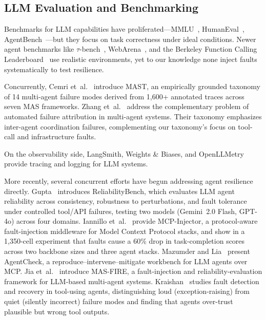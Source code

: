 \documentclass[make,article,submit,moreauthors,pdftex]{mdpi}
\begin{document}
\subsection{LLM Evaluation and Benchmarking}

Benchmarks for LLM capabilities have proliferated---MMLU~\cite{hendrycks2021measuring}, HumanEval~\cite{chen2021evaluating}, AgentBench~\cite{liu2023agentbench}---but they focus on task correctness under ideal conditions. Newer agent benchmarks like $\tau$-bench~\cite{yao2024tau}, WebArena~\cite{zhou2024webarena}, and the Berkeley Function Calling Leaderboard~\cite{patil2025bfcl} use realistic environments, yet to our knowledge none inject faults systematically to test resilience.

{Concurrently, Cemri et~al.~\cite{cemri2025mast} introduce MAST, an empirically grounded taxonomy of 14 multi-agent failure modes derived from 1{,}600+ annotated traces across seven MAS frameworks. Zhang et~al.~\cite{zhang2025failure} address the complementary problem of automated failure attribution in multi-agent systems. Their taxonomy emphasizes inter-agent coordination failures, complementing our taxonomy's focus on tool-call and infrastructure faults.}

On the observability side, LangSmith, Weights \& Biases, and OpenLLMetry~\cite{openllmetry2024} provide tracing and logging for LLM systems.

{More recently, several concurrent efforts have begun addressing agent resilience directly. Gupta~\cite{reliabilitybench2026} introduces ReliabilityBench, which evaluates LLM agent reliability across consistency, robustness to perturbations, and fault tolerance under controlled tool/API failures, testing two models (Gemini~2.0 Flash, GPT-4o) across four domains. Iannillo et~al.~\cite{mcpinjector2026} provide MCP-Injector, a protocol-aware fault-injection middleware for Model Context Protocol stacks, and show in a 1{,}350-cell experiment that faults cause a 60\% drop in task-completion scores across two backbone sizes and three agent stacks. Mazumder and Lia~\cite{mazumder2026agentcheck} present AgentCheck, a reproduce--intervene--mitigate workbench for LLM agents over MCP. Jia et~al.~\cite{jia2026masfire} introduce MAS-FIRE, a fault-injection and reliability-evaluation framework for LLM-based multi-agent systems. Kraishan~\cite{kraishan2026loud} studies fault detection and recovery in tool-using agents, distinguishing loud (exception-raising) from quiet (silently incorrect) failure modes and finding that agents over-trust plausible but wrong tool outputs.}
\end{document}
